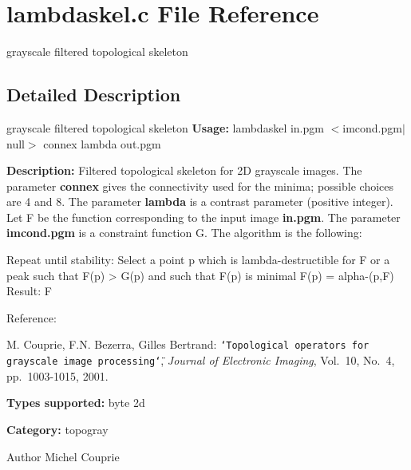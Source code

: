 \section{lambdaskel.c File Reference}
\label{lambdaskel_8c}


grayscale filtered topological skeleton  




\subsection{Detailed Description}
grayscale filtered topological skeleton {\bfseries Usage:} lambdaskel in.pgm $<$imcond.pgm$|$null$>$ connex lambda out.pgm

{\bfseries Description:} Filtered topological skeleton for 2D grayscale images. The parameter {\bfseries connex} gives the connectivity used for the minima; possible choices are 4 and 8. The parameter {\bfseries lambda} is a contrast parameter (positive integer). Let F be the function corresponding to the input image {\bfseries in.pgm}. The parameter {\bfseries imcond.pgm} is a constraint function G. The algorithm is the following:

\begin{DoxyVerb}
Repeat until stability:
    Select a point p which is lambda-destructible for F or a peak
        such that F(p) > G(p) and such that F(p) is minimal
    F(p) = alpha-(p,F)
Result: F
\end{DoxyVerb}


Reference:\par
 M. Couprie, F.N. Bezerra, Gilles Bertrand: {\tt \char`\"{}Topological operators for
grayscale image processing\char`\"{}}, {\itshape  Journal of Electronic Imaging\/}, Vol.~10, No.~4, pp.~1003-\/1015, 2001.

{\bfseries Types supported:} byte 2d

{\bfseries Category:} topogray

\begin{DoxyAuthor}{Author}
Michel Couprie 
\end{DoxyAuthor}
